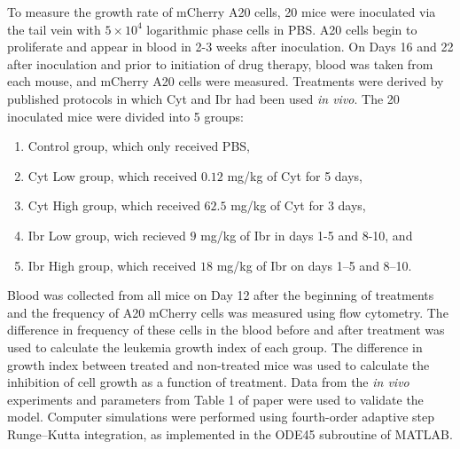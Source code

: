 To measure the growth rate of mCherry A20 cells, 20 mice were inoculated via the tail vein with $5 \times 10^4$ logarithmic phase cells in PBS. A20 cells begin to proliferate and appear in blood in 2-3 weeks after inoculation.
On Days 16 and 22 after inoculation and prior to initiation of drug therapy, blood was taken from each mouse, and mCherry A20 cells were measured. Treatments were derived by published protocols in which Cyt and Ibr had been used \textit{in vivo}. The 20 inoculated mice were divided into 5 groups: 
\begin{enumerate}
	\item Control group, which only received PBS,
	\item Cyt Low group, which received $0.12$ mg/kg of Cyt for 5 days,
	\item Cyt High group, which received $62.5$ mg/kg of Cyt for 3 days, 
	\item Ibr Low group, wich recieved $9$ mg/kg of Ibr in days 1-5 and 8-10, and
	\item Ibr High group, which received $18$ mg/kg of Ibr on days 1–5 and 8–10. 
\end{enumerate}

Blood was collected from all mice on Day 12 after the beginning of treatments and the frequency of A20 mCherry cells was measured using flow cytometry. The difference in frequency of these cells in the blood before and after treatment was used to calculate the leukemia growth index of each group. The difference in growth index between treated and non-treated mice was used to calculate the inhibition of cell growth as a function of treatment.
Data from the \textit{in vivo} experiments and parameters from Table 1 of paper were used to validate the model. Computer simulations were performed using fourth-order adaptive step Runge–Kutta integration, as implemented in the ODE45 subroutine of MATLAB.
